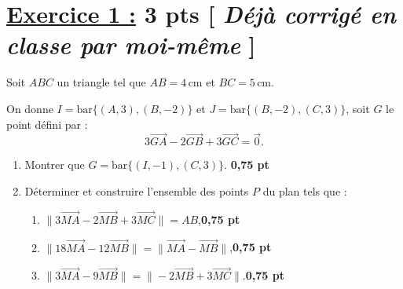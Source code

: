 \documentclass[12pt,a4paper]{article}
\begin{document}
\renewcommand{\arraystretch}{1.5}
\renewcommand{\arrayrulewidth}{1.2pt}
\newcommand{\encercle}[1]{\tikz[baseline=(X.base)] \node (X) [draw, circle, inner sep=1pt] {#1};}
\vspace{3cm}

\section*{\underline{Exercice 1 :} 3 pts [\textit{ Déjà corrigé en classe par moi-même} ]}
Soit \( ABC \) un triangle tel que \( AB = 4\,\text{cm} \) et \( BC = 5\,\text{cm} \).

On donne \( I = \text{bar} \{(A,3), (B,-2)\} \) et \( J = \text{bar} \{(B,-2), (C,3)\} \), soit \( G \) le point défini par :
\[
3\overrightarrow{GA} - 2\overrightarrow{GB} + 3\overrightarrow{GC} = \overrightarrow{0}.
\]

\begin{enumerate}
    \item Montrer que \( G = \text{bar} \{(I,-1), (C,3)\} \). \hfill \textbf{0,75 pt}
    \item Déterminer et construire l'ensemble des points \( P \) du plan tels que :
    \begin{enumerate}
        \item \( \|3\overrightarrow{MA} - 2\overrightarrow{MB} + 3\overrightarrow{MC}\| = AB \),\hfill \textbf{0,75 pt}
        \item \( \|18\overrightarrow{MA} - 12\overrightarrow{MB}\| = \|\overrightarrow{MA} - \overrightarrow{MB}\| \),\hfill \textbf{0,75 pt}
        \item \( \|3\overrightarrow{MA} - 9\overrightarrow{MB}\| = \| -2\overrightarrow{MB} + 3\overrightarrow{MC}\| \).\hfill \textbf{0,75 pt}
    \end{enumerate}
\end{enumerate}
\end{document}
